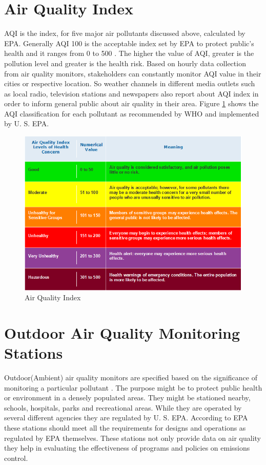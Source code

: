 \documentclass[sigconf]{acmart}
\begin{document}
{  \section{Air Quality Index} AQI is the index, for five major air pollutants discussed above, calculated by EPA. Generally AQI 100 is the acceptable index set by EPA to protect public's health and it ranges from 0 to 500 \cite{airnow-gov}. The higher the value of AQI, greater is the pollution level and greater is the health risk. Based on hourly data collection from air quality monitors, stakeholders can constantly monitor AQI value in their cities or respective location. So weather channels in different media outlets such as local radio, television stations and newspapers also report about AQI index in order to inform general public about air quality in their area. Figure \ref{AQI} shows the AQI classification for each pollutant as recommended by WHO and implemented by U. S. EPA.
  \begin{figure}[htb] \includegraphics[width=1.0\columnwidth]{images/AQiclassification.png} \caption{Air Quality Index \cite{airnow-gov}} \label{AQI} \end{figure}
  \section{Outdoor Air Quality Monitoring Stations} Outdoor(Ambient) air quality monitors are specified based on the significance of monitoring a particular pollutant \cite{air-quality}. The purpose might be to protect public health or environment in a densely populated areas. They might be stationed nearby, schools, hospitals, parks and recreational areas. While they are operated by several different agencies they are regulated by U. S. EPA. According to EPA these stations should meet all the requirements for designs and operations as regulated by EPA themselves. These stations not only provide data on air quality they help in evaluating the effectiveness of programs and policies on emissions control.
  
}
\end{document}
